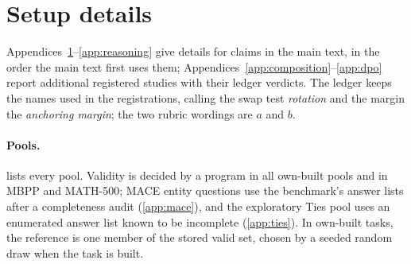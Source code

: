 
\FloatBarrier
\section{Setup details}
\label{app:setup}

Appendices~\ref{app:setup}--\ref{app:reasoning} give details for claims in the main text, in the order the main text first uses them; Appendices~\ref{app:composition}--\ref{app:dpo} report additional registered studies with their ledger verdicts. The ledger keeps the names used in the registrations, calling the swap test \emph{rot\-ation} and the margin the \emph{an\-choring margin}; the two rubric wordings are $a$ and $b$.

\paragraph{Pools.}
 lists every pool. Validity is decided by a program in all own-built pools and in MBPP and MATH-500; \textsc{MACE} entity questions use the benchmark's answer lists after a completeness audit (\cref{app:mace}), and the exploratory Ties pool uses an enumerated answer list known to be incomplete (\cref{app:ties}).
In own-built tasks, the reference is one member of the stored valid set, chosen by a seeded random draw when the task is built.

